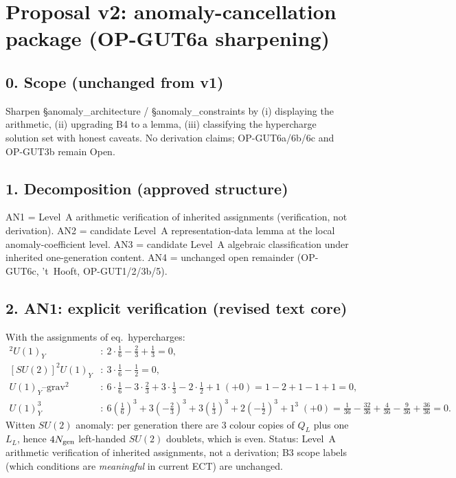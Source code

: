 \section*{Proposal v2: anomaly-cancellation package (OP-GUT6a sharpening)}

\subsection*{0. Scope (unchanged from v1)}
Sharpen \S anomaly\_architecture / \S anomaly\_constraints by
(i) displaying the arithmetic, (ii) upgrading B4 to a lemma,
(iii) classifying the hypercharge solution set with honest caveats.
No derivation claims; OP-GUT6a/6b/6c and OP-GUT3b remain Open.

\subsection*{1. Decomposition (approved structure)}
AN1 = Level~A arithmetic verification of inherited assignments
(verification, not derivation).
AN2 = candidate Level~A representation-data lemma at the local
anomaly-coefficient level.
AN3 = candidate Level~A algebraic classification under inherited
one-generation content.
AN4 = unchanged open remainder (OP-GUT6c, 't~Hooft, OP-GUT1/2/3b/5).

\subsection*{2. AN1: explicit verification (revised text core)}
With the assignments of eq.~hypercharges:
\begin{align*}
[SU(3)]^2 U(1)_Y&:\ 2\cdot\tfrac16-\tfrac23+\tfrac13=0,\\
[SU(2)]^2 U(1)_Y&:\ 3\cdot\tfrac16-\tfrac12=0,\\
U(1)_Y\text{--}\mathrm{grav}^2&:\
  6\cdot\tfrac16-3\cdot\tfrac23+3\cdot\tfrac13-2\cdot\tfrac12+1
  \;(+0)=1-2+1-1+1=0,\\
U(1)_Y^3&:\ 6(\tfrac16)^3+3(-\tfrac23)^3+3(\tfrac13)^3
  +2(-\tfrac12)^3+1^3\;(+0)
  =\tfrac1{36}-\tfrac{32}{36}+\tfrac{4}{36}-\tfrac{9}{36}
  +\tfrac{36}{36}=0.
\end{align*}
Witten $SU(2)$ anomaly: per generation there are $3$ colour copies
of $Q_L$ plus one $L_L$, hence $4N_{\rm gen}$ left-handed $SU(2)$
doublets, which is even.
Status: Level~A arithmetic verification of inherited assignments,
not a derivation; B3 scope labels (which conditions are
\emph{meaningful} in current ECT) are unchanged.

